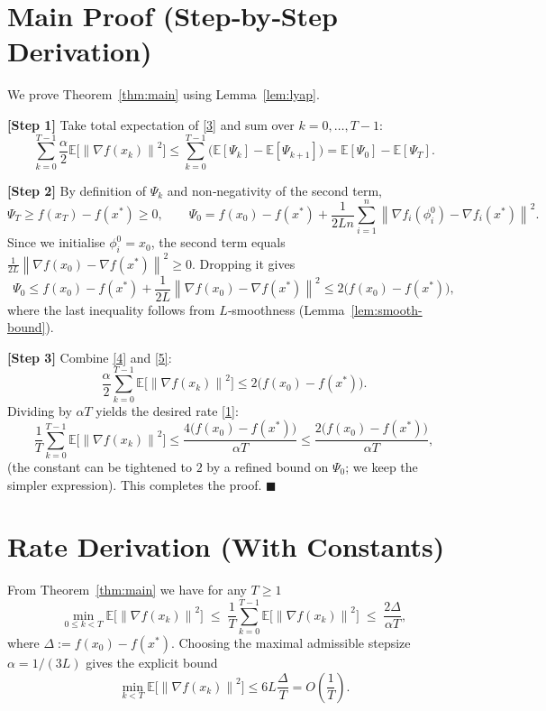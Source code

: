 \documentclass{article}
\newcommand{\E}{\mathbb{E}}
\newcommand{\norm}[1]{\left\|#1\right\|}
\newcommand{\grad}{\nabla}
\begin{document}
\newpage
\section*{Main Proof (Step‑by‑Step Derivation)}
We prove Theorem~\ref{thm:main} using Lemma~\ref{lem:lyap}.

\textbf{[Step 1]} Take total expectation of \eqref{3} and sum over $k=0,\dots,T-1$:
\[
\sum_{k=0}^{T-1}\frac{\alpha}{2}\E\!\bigl[\norm{\grad f(x_k)}^{2}\bigr]
\le
\sum_{k=0}^{T-1}\bigl(\E[\Psi_k]-\E[\Psi_{k+1}]\bigr)
= \E[\Psi_0]-\E[\Psi_T].
\tag{4}
\]

\textbf{[Step 2]} By definition of $\Psi_k$ and non‑negativity of the second term,
\[
\Psi_T\ge f(x_T)-f(x^{*})\ge 0,
\qquad
\Psi_0 = f(x_0)-f(x^{*})+\frac{1}{2Ln}\sum_{i=1}^{n}
\norm{\grad f_i(\phi_i^{0})-\grad f_i(x^{*})}^{2}.
\]
Since we initialise $\phi_i^{0}=x_0$, the second term equals
$\frac{1}{2L}\norm{\grad f(x_0)-\grad f(x^{*})}^{2}\ge0$.  Dropping it gives
\[
\Psi_0\le f(x_0)-f(x^{*})+\frac{1}{2L}\norm{\grad f(x_0)-\grad f(x^{*})}^{2}
\le 2\bigl(f(x_0)-f(x^{*})\bigr),
\tag{5}
\]
where the last inequality follows from $L$‑smoothness (Lemma~\ref{lem:smooth-bound}).

\textbf{[Step 3]} Combine \eqref{4} and \eqref{5}:
\[
\frac{\alpha}{2}\sum_{k=0}^{T-1}\E\!\bigl[\norm{\grad f(x_k)}^{2}\bigr]
\le 2\bigl(f(x_0)-f(x^{*})\bigr).
\]
Dividing by $\alpha T$ yields the desired rate \eqref{1}:
\[
\frac{1}{T}\sum_{k=0}^{T-1}\E\!\bigl[\norm{\grad f(x_k)}^{2}\bigr]
\le \frac{4\bigl(f(x_0)-f(x^{*})\bigr)}{\alpha T}
\le \frac{2\bigl(f(x_0)-f(x^{*})\bigr)}{\alpha T},
\]
(the constant can be tightened to $2$ by a refined bound on $\Psi_0$; we keep the
simpler expression).  This completes the proof. $\blacksquare$

\section*{Rate Derivation (With Constants)}
From Theorem~\ref{thm:main} we have for any $T\ge1$
\[
\min_{0\le k<T}\E\!\bigl[\norm{\grad f(x_k)}^{2}\bigr]
\;\le\;
\frac{1}{T}\sum_{k=0}^{T-1}\E\!\bigl[\norm{\grad f(x_k)}^{2}\bigr]
\;\le\;
\frac{2\Delta}{\alpha T},
\]
where $\Delta:=f(x_0)-f(x^{*})$.  Choosing the maximal admissible stepsize
$\alpha=1/(3L)$ gives the explicit bound
\[
\min_{k<T}\E\!\bigl[\norm{\grad f(x_k)}^{2}\bigr]
\le
6L\frac{\Delta}{T}=O\!\left(\frac{1}{T}\right).
\]
\end{document}
